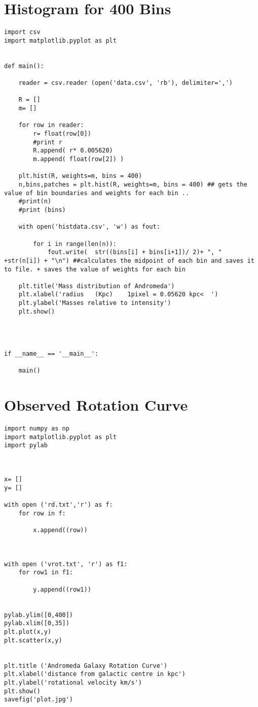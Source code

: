 \section{Histogram for 400 Bins}
\begin{verbatim}
import csv
import matplotlib.pyplot as plt


def main():

    reader = csv.reader (open('data.csv', 'rb'), delimiter=',')

    R = []
    m= []

    for row in reader:
        r= float(row[0])
        #print r
        R.append( r* 0.005620)
        m.append( float(row[2]) )

    plt.hist(R, weights=m, bins = 400)
    n,bins,patches = plt.hist(R, weights=m, bins = 400) ## gets the value of bin boundaries and weights for each bin ..
    #print(n)
    #print (bins)

    with open('histdata.csv', 'w') as fout:

        for i in range(len(n)):
            fout.write(  str((bins[i] + bins[i+1])/ 2)+ ", " +str(n[i]) + "\n") ##calculates the midpoint of each bin and saves it to file. + saves the value of weights for each bin

    plt.title('Mass distribution of Andromeda')
    plt.xlabel('radius   (Kpc)    1pixel = 0.05620 kpc<  ')
    plt.ylabel('Masses relative to intensity')
    plt.show()




if __name__ == '__main__':

    main()
\end{verbatim}

\section{Observed Rotation Curve}
\begin{verbatim}
import numpy as np
import matplotlib.pyplot as plt
import pylab



x= []
y= []

with open ('rd.txt','r') as f:
    for row in f:

        x.append((row))



with open ('vrot.txt', 'r') as f1:
    for row1 in f1:

        y.append((row1))


pylab.ylim([0,400])
pylab.xlim([0,35])
plt.plot(x,y)
plt.scatter(x,y)


plt.title ('Andromeda Galaxy Rotation Curve')
plt.xlabel('distance from galactic centre in kpc')
plt.ylabel('rotational velocity km/s')
plt.show()
savefig('plot.jpg')

\end{verbatim}

